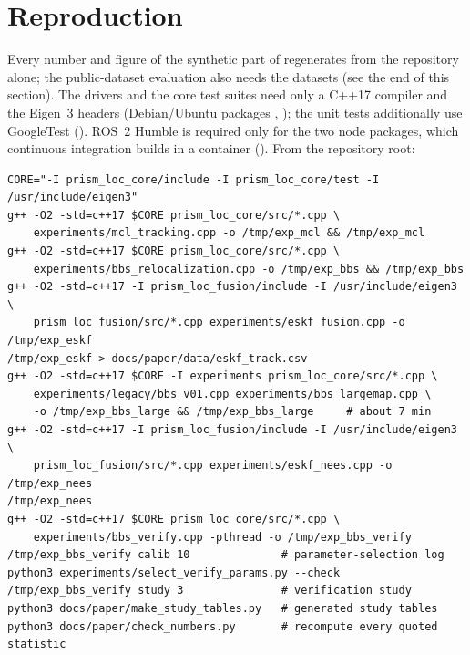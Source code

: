 \section{Reproduction}\label{app:repro}

Every number and figure of the synthetic part of  regenerates from the repository alone; the public-dataset evaluation also needs the datasets (see the end of this section). The drivers and the core test suites need only a C++17 compiler and the Eigen~3 headers (Debian/Ubuntu packages , ); the unit tests additionally use GoogleTest (). ROS~2 Humble is required only for the two node packages, which continuous integration builds in a  container (). From the repository root:

{\footnotesize
\begin{verbatim}
CORE="-I prism_loc_core/include -I prism_loc_core/test -I /usr/include/eigen3"
g++ -O2 -std=c++17 $CORE prism_loc_core/src/*.cpp \
    experiments/mcl_tracking.cpp -o /tmp/exp_mcl && /tmp/exp_mcl
g++ -O2 -std=c++17 $CORE prism_loc_core/src/*.cpp \
    experiments/bbs_relocalization.cpp -o /tmp/exp_bbs && /tmp/exp_bbs
g++ -O2 -std=c++17 -I prism_loc_fusion/include -I /usr/include/eigen3 \
    prism_loc_fusion/src/*.cpp experiments/eskf_fusion.cpp -o /tmp/exp_eskf
/tmp/exp_eskf > docs/paper/data/eskf_track.csv
g++ -O2 -std=c++17 $CORE -I experiments prism_loc_core/src/*.cpp \
    experiments/legacy/bbs_v01.cpp experiments/bbs_largemap.cpp \
    -o /tmp/exp_bbs_large && /tmp/exp_bbs_large     # about 7 min
g++ -O2 -std=c++17 -I prism_loc_fusion/include -I /usr/include/eigen3 \
    prism_loc_fusion/src/*.cpp experiments/eskf_nees.cpp -o /tmp/exp_nees
/tmp/exp_nees
g++ -O2 -std=c++17 $CORE prism_loc_core/src/*.cpp \
    experiments/bbs_verify.cpp -pthread -o /tmp/exp_bbs_verify
/tmp/exp_bbs_verify calib 10              # parameter-selection log
python3 experiments/select_verify_params.py --check
/tmp/exp_bbs_verify study 3               # verification study
python3 docs/paper/make_study_tables.py   # generated study tables
python3 docs/paper/check_numbers.py       # recompute every quoted statistic
\end{verbatim}
}

